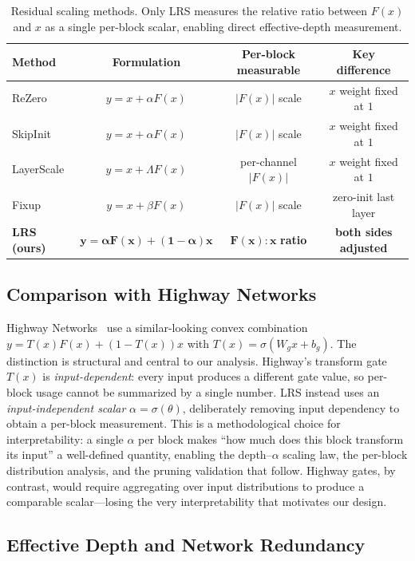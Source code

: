 \documentclass{bmvc2k}
\begin{document}
\begin{table}[!ht]
\centering
\small
\caption{Residual scaling methods. Only LRS measures the relative ratio between $F(x)$ and $x$ as a single per-block scalar, enabling direct effective-depth measurement.}
\label{tab:comparison}
\begin{tabular}{lccc}
\toprule
\textbf{Method} & \textbf{Formulation} & \textbf{Per-block measurable} & \textbf{Key difference} \\
\midrule
ReZero & $y = x + \alpha F(x)$ & $|F(x)|$ scale & $x$ weight fixed at $1$ \\
SkipInit & $y = x + \alpha F(x)$ & $|F(x)|$ scale & $x$ weight fixed at $1$ \\
LayerScale & $y = x + \Lambda F(x)$ & per-channel $|F(x)|$ & $x$ weight fixed at $1$ \\
Fixup & $y = x + \beta F(x)$ & $|F(x)|$ scale & zero-init last layer \\
\textbf{LRS (ours)} & $\mathbf{y = \alpha F(x) + (1{-}\alpha)x}$ & $\mathbf{F(x){:}x}$ \textbf{ratio} & \textbf{both sides adjusted} \\
\bottomrule
\end{tabular}
\end{table}

\subsection{Comparison with Highway Networks}

Highway Networks~\cite{srivastava2015highway} use a similar-looking convex combination $y = T(x) F(x) + (1{-}T(x)) x$ with $T(x) = \sigma(W_g x + b_g)$. The distinction is structural and central to our analysis. Highway's transform gate $T(x)$ is \emph{input-dependent}: every input produces a different gate value, so per-block usage cannot be summarized by a single number. LRS instead uses an \emph{input-independent scalar} $\alpha = \sigma(\theta)$, deliberately removing input dependency to obtain a per-block measurement. This is a methodological choice for interpretability: a single $\alpha$ per block makes ``how much does this block transform its input'' a well-defined quantity, enabling the depth--$\alpha$ scaling law, the per-block distribution analysis, and the pruning validation that follow. Highway gates, by contrast, would require aggregating over input distributions to produce a comparable scalar---losing the very interpretability that motivates our design.

\subsection{Effective Depth and Network Redundancy}
\end{document}
